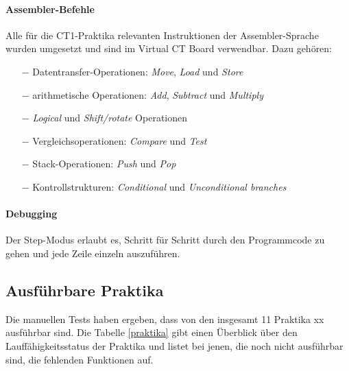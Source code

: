 \documentclass[10pt]{article}
\begin{document}
\paragraph{Assembler-Befehle} Alle für die CT1-Praktika relevanten Instruktionen der Assembler-Sprache wurden umgesetzt und sind im \glqq Virtual CT Board\grqq{} verwendbar. Dazu gehören:
\begin{itemize}
	\item[$-$] Datentransfer-Operationen: \emph{Move}, \emph{Load} und \emph{Store}
	\item[$-$] arithmetische Operationen: \emph{Add}, \emph{Subtract} und \emph{Multiply}
	\item[$-$] \emph{Logical} und \emph{Shift/rotate} Operationen
	\item[$-$] Vergleichsoperationen: \emph{Compare} und \emph{Test}
	\item[$-$] Stack-Operationen: \emph{Push} und \emph{Pop} %
	\item[$-$] Kontrollstrukturen: \emph{Conditional} und \emph{Unconditional branches}
\end{itemize}

\paragraph{Debugging} Der Step-Modus erlaubt es, Schritt für Schritt durch den Programmcode zu gehen und jede Zeile einzeln auszuführen.

\subsection{Ausführbare Praktika}


Die manuellen Tests haben ergeben, dass von den insgesamt 11 Praktika xx ausführbar sind. Die Tabelle \ref{praktika} gibt einen Überblick über den Lauffähigkeitsstatus der Praktika und listet bei jenen, die noch nicht ausführbar sind, die fehlenden Funktionen auf.
\end{document}
